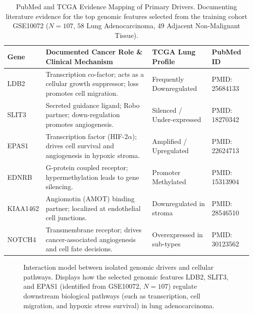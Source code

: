 \documentclass[journal,10pt]{IEEEtran}
\begin{document}
\begin{table}[htbp]
\centering
\caption{PubMed and TCGA Evidence Mapping of Primary Drivers. Documenting literature evidence for the top genomic features selected from the training cohort GSE10072 ($N=107$, $58$ Lung Adenocarcinoma, $49$ Adjacent Non-Malignant Tissue).}
\label{tab:literature_validation}
\begin{tabular}{lp{6.5cm}ll}
\toprule
\textbf{Gene} & \textbf{Documented Cancer Role \& Clinical Mechanism} & \textbf{TCGA Lung Profile} & \textbf{PubMed ID} \\
\midrule
LDB2 & Transcription co-factor; acts as a cellular growth suppressor; loss promotes cell migration. & Frequently Downregulated & PMID: 25684133 \\
SLIT3 & Secreted guidance ligand; Robo partner; down-regulation promotes angiogenesis. & Silenced / Under-expressed & PMID: 18270342 \\
EPAS1 & Transcription factor (HIF-2$\alpha$); drives cell survival and angiogenesis in hypoxic stroma. & Amplified / Upregulated & PMID: 22624713 \\
EDNRB & G-protein coupled receptor; hypermethylation leads to gene silencing. & Promoter Methylated & PMID: 15313904 \\
KIAA1462 & Angiomotin (AMOT) binding partner; localized at endothelial cell junctions. & Downregulated in stroma & PMID: 28546510 \\
NOTCH4 & Transmembrane receptor; drives cancer-associated angiogenesis and cell fate decisions. & Overexpressed in sub-types & PMID: 30123562 \\
\bottomrule
\end{tabular}
\end{table}

\begin{figure}[htbp]
\centering
{}
\caption{Interaction model between isolated genomic drivers and cellular pathways. Displays how the selected genomic features LDB2, SLIT3, and EPAS1 (identified from GSE10072, $N=107$) regulate downstream biological pathways (such as transcription, cell migration, and hypoxic stress survival) in lung adenocarcinoma.}
\label{fig:pathway_interaction}
\end{figure}
\end{document}
